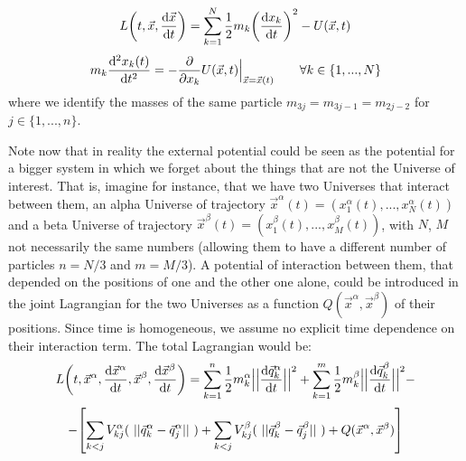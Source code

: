 \documentclass[11pt, a4paper]{article} %
\DeclareRobustCommand{\mybox}[2][gray!10]{%
\begin{tcolorbox}[   %
        left=0.2cm,
        right=0.2cm,
        top=0.15cm,
        bottom=0.15cm,
        colback=#1,
        colframe=#1,
        width=\dimexpr\textwidth\relax, 
        enlarge left by=0mm,
        boxsep=5pt,
        arc=0pt,outer arc=0pt,
        ]
        #2
\end{tcolorbox}
}
\begin{document}
\begin{equation}\label{genLag2}
L\qty(t, \vec{x}, \dv{\vec{x}}{t})=\sum_{k=1}^N\frac{1}{2} m_k\qty(\dv{x_k}{t})^2-U(\vec{x},t)
\end{equation}
\begin{equation}
m_k \dv[2]{x_k(t)}{t} = -\pdv{}{x_k}U(\vec{x},t)\Big\rvert_{\vec{x}=\vec{x}(t)}\quad\quad \forall k\in\{1,...,N\}
\end{equation}
where we identify the masses of the same particle $m_{3j}=m_{3j-1}=m_{2j-2}$ for $j\in\{1,...,n\}$.
\mybox{
Note now that in reality the external potential could be seen as the potential for a bigger system in which we forget about the things that are not the Universe of interest. That is, imagine for instance, that we have two Universes that interact between them, an alpha Universe of trajectory $\vec{x}^\alpha(t)=(x_1^\alpha(t),...,x_N^\alpha(t))$ and a beta Universe of trajectory $\vec{x}^\beta(t)=(x_1^\beta(t),...,x_M^\beta(t))$, with $N$, $M$ not necessarily the same numbers (allowing them to have a different number of particles $n=N/3$ and $m=M/3$). A potential of interaction between them, that depended on the positions of one and the other one alone, could be introduced in the joint Lagrangian for the two Universes as a function $Q(\vec{x}^\alpha, \vec{x}^\beta)$ of their positions. Since time is homogeneous, we assume no explicit time dependence on their interaction term. The total Lagrangian would be:
\begin{equation}
L\qty(t, \vec{x}^\alpha, \dv{\vec{x}^\alpha}{t}, \vec{x}^\beta, \dv{\vec{x}^\beta}{t})=\sum_{k=1}^n\frac{1}{2} m^\alpha_k\Big|\Big|\dv{\vec{q}^\alpha_k}{t}\Big|\Big|^2+\sum_{k=1}^m\frac{1}{2} m^\beta_k\Big|\Big|\dv{\vec{q}^\beta_k}{t}\Big|\Big|^2-
\end{equation}
$$
-\qty[\sum_{k<j} V^\alpha_{kj}(\ ||\vec{q}^\alpha_k-\vec{q}^\alpha_j||\ )+\sum_{k<j} V^\beta_{kj}(\ ||\vec{q}^\beta_k-\vec{q}^\beta_j||\ )+ Q(\vec{x}^\alpha, \vec{x}^\beta)]
$$

}
\end{document}
